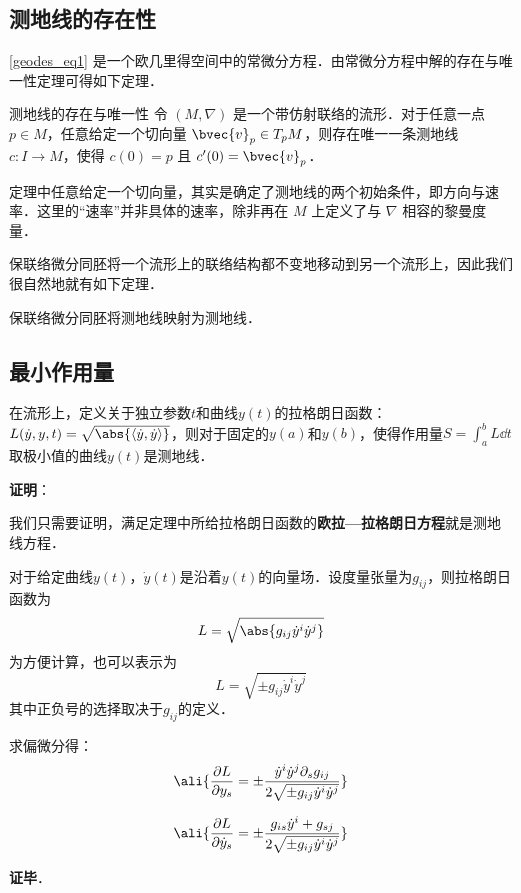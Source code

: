 \subsection{测地线的存在性}

\autoref{geodes_eq1} 是一个欧几里得空间中的常微分方程．由常微分方程中解的存在与唯一性定理可得如下定理．

\begin{theorem}{测地线的存在与唯一性}
令 $(M, \nabla)$ 是一个带仿射联络的流形．对于任意一点 $p\in M$，任意给定一个切向量 $\bvec{v}_p\in T_pM$，则存在唯一一条测地线 $c:I\to M$，使得 $c(0)=p$ 且 $c'(0)=\bvec{v}_p$．
\end{theorem}

定理中任意给定一个切向量，其实是确定了测地线的两个初始条件，即方向与速率．这里的“速率”并非具体的速率，除非再在 $M$ 上定义了与 $\nabla$ 相容的黎曼度量．

保联络微分同胚将一个流形上的联络结构都不变地移动到另一个流形上，因此我们很自然地就有如下定理．

\begin{theorem}{}
保联络微分同胚将测地线映射为测地线．
\end{theorem}



\subsection{最小作用量}

\begin{theorem}{}
在流形上，定义关于独立参数$t$和曲线$y(t)$的拉格朗日函数：$L(\dot{y}, y, t) = \sqrt{\abs{\langle \dot{y}, \dot{y} \rangle}}$，则对于固定的$y(a)$和$y(b)$，使得作用量$S=\int_a^b L \dd t$取极小值的曲线$y(t)$是测地线．
\end{theorem}

\textbf{证明}：

我们只需要证明，满足定理中所给拉格朗日函数的\textbf{欧拉—拉格朗日方程}就是测地线方程．

对于给定曲线$y(t)$，$\dot{y}(t)$是沿着$y(t)$的向量场．设度量张量为$g_{ij}$，则拉格朗日函数为
\begin{equation}
L = \sqrt{\abs{g_{ij}\dot{y}^i\dot{y}^j}}
\end{equation}
为方便计算，也可以表示为
\begin{equation}
L = \sqrt{\pm{g_{ij}\dot{y}^i\dot{y}^j}}
\end{equation}
其中正负号的选择取决于$g_{ij}$的定义．

求偏微分得：
\begin{equation}
\ali{
    \frac{\partial L}{\partial y_s} = \pm \frac{\dot{y}^i\dot{y}^j\partial_s g_{ij}}{2\sqrt{\pm{g_{ij}\dot{y}^i\dot{y}^j}}}
}
\end{equation}

\begin{equation}
\ali{
    \frac{\partial L}{\partial \dot{y}_s} = \pm \frac{g_{is}\dot{y}^i+g_{sj}}{2\sqrt{\pm{g_{ij}\dot{y}^i\dot{y}^j}}}
}
\end{equation}

\textbf{证毕}．

















